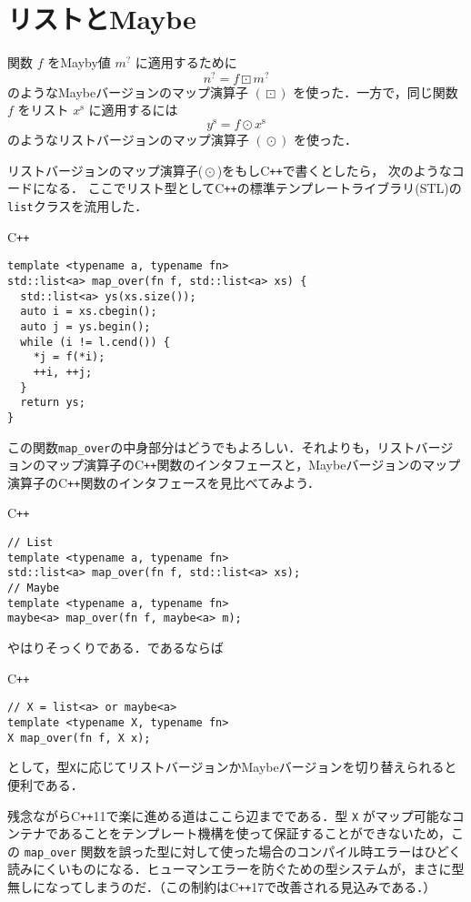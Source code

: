 \documentclass[a4paper,draft]{jsbook}
\newcommand{\programminglanguage}[1]{\textsf{#1}}
\newcommand{\cxx}{\programminglanguage{C}\texttt{++}}
\newcommand{\cxxeleven}{\cxx\programminglanguage{11}}
\newcommand{\cxxseventeen}{\cxx\programminglanguage{17}}
\newcommand{\code}[1]{\texttt{#1}}
\newenvironment{cxxcode}{\begin{itembox}[r]{\cxx}}{\end{itembox}}
\newcommand{\mListVar}[1]{{#1}^\mathrm{s}}
\newcommand{\mMaybeVar}[1]{{#1}^\text{?}}
\DeclareMathOperator{\mMapList}{\odot}
\DeclareMathOperator{\mMapMaybe}{\boxdot}
\begin{document}
\section{リストとMaybe}

関数 $f$ をMayby値 $\mMaybeVar{m}$ に適用するために
\begin{equation}
\mMaybeVar{n}=f\mMapMaybe\mMaybeVar{m}
\end{equation}
のようなMaybeバージョンのマップ演算子 $(\mMapMaybe)$ を使った．一方で，同じ関数 $f$ をリスト $\mListVar{x}$ に適用するには
\begin{equation}
\mListVar{y}=f\mMapList\mListVar{x}
\end{equation}
のようなリストバージョンのマップ演算子 $(\mMapList)$ を使った．

リストバージョンのマップ演算子($\mMapList$)をもし\cxx で書くとしたら，
次のようなコードになる．
ここでリスト型として\cxx の標準テンプレートライブラリ(STL)の
\code{list}クラスを流用した．
\begin{cxxcode}
\begin{verbatim}
template <typename a, typename fn>
std::list<a> map_over(fn f, std::list<a> xs) {
  std::list<a> ys(xs.size());
  auto i = xs.cbegin();
  auto j = ys.begin();
  while (i != l.cend()) {
    *j = f(*i);
    ++i, ++j;
  }
  return ys;
}
\end{verbatim}
\end{cxxcode}
この関数\code{map\_over}の中身部分はどうでもよろしい．それよりも，リストバージョンのマップ演算子の\cxx 関数のインタフェースと，Maybeバージョンのマップ演算子の\cxx 関数のインタフェースを見比べてみよう．
\begin{cxxcode}
\begin{verbatim}
// List
template <typename a, typename fn>
std::list<a> map_over(fn f, std::list<a> xs);
// Maybe
template <typename a, typename fn>
maybe<a> map_over(fn f, maybe<a> m);
\end{verbatim}
\end{cxxcode}
やはりそっくりである．であるならば
\begin{cxxcode}
\begin{verbatim}
// X = list<a> or maybe<a>
template <typename X, typename fn>
X map_over(fn f, X x);
\end{verbatim}
\end{cxxcode}
として，型\code{X}に応じてリストバージョンかMaybeバージョンを切り替えられると便利である．

残念ながら\cxxeleven で楽に進める道はここら辺までである．型 \code{X} がマップ可能なコンテナであることをテンプレート機構を使って保証することができないため，この \code{map\_over} 関数を誤った型に対して使った場合のコンパイル時エラーはひどく読みにくいものになる．ヒューマンエラーを防ぐための型システムが，まさに型無しになってしまうのだ．（この制約は\cxxseventeen で改善される見込みである．）
\end{document}

